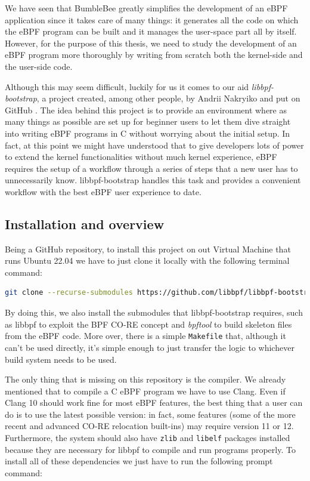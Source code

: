 We have seen that BumbleBee greatly simplifies the development of an eBPF application since it takes care of many things: it generates all the code on which the eBPF program can be built and it manages the user-space part all by itself.
However, for the purpose of this thesis, we need to study the development of an eBPF program more thoroughly by writing from scratch both the kernel-side and the user-side code.

Although this may seem difficult, luckily for us it comes to our aid \textit{libbpf-bootstrap}, a project created, among other people, by Andrii Nakryiko and put on GitHub \cite{libbpfbootstrapGithubRepo}.
The idea behind this project is to provide an environment where as many things as possible are set up for beginner users to let them dive straight into writing eBPF programs in C without worrying about the initial setup.
In fact, at this point we might have understood that to give developers lots of power to extend the kernel functionalities without much kernel experience, eBPF requires the setup of a workflow through a series of steps that a new user has to unnecessarily know.
libbpf-bootstrap handles this task and provides a convenient workflow with the best eBPF user experience to date.

\subsection{Installation and overview}

Being a GitHub repository, to install this project on out Virtual Machine that runs Ubuntu 22.04 we have to just clone it locally with the following terminal command:

\begin{lstlisting}[style=commandline, language=bash, caption={libbpf-bootstrap clone command}]
	git clone --recurse-submodules https://github.com/libbpf/libbpf-bootstrap
\end{lstlisting}

By doing this, we also install the submodules that libbpf-bootstrap requires, such as  libbpf to exploit the BPF CO-RE concept and \textit{bpftool} to build skeleton files from the eBPF code.
More over, there is a simple \colorbox{backcolour}{\lstinline[style=highlight, language=bash]|Makefile|} that, although it can't be used directly, it's simple enough to just transfer the logic to whichever build system needs to be used.

The only thing that is missing on this repository is the compiler.
We already mentioned that to compile a C eBPF program we have to use Clang.
Even if Clang 10 should work fine for most eBPF features, the best thing that a user can do is to use the latest possible version: in fact, some features (some of the more recent and advanced CO-RE relocation built-ins) may require version 11 or 12.
Furthermore, the system should also have \colorbox{backcolour}{\lstinline[style=highlight, language=bash]|zlib|} and \colorbox{backcolour}{\lstinline[style=highlight, language=bash]|libelf|} packages installed because they are necessary for libbpf to compile and run programs properly.
To install all of these dependencies we just have to run the following prompt command:

